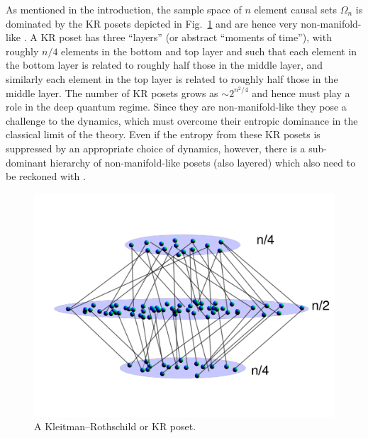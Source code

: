 As mentioned in the  introduction, the sample space of $n$ element causal sets $\Omega_n$ is dominated by the KR posets
depicted in Fig.~\ref{kr.fig} and are hence very non-manifold-like    \citep{kr}. A KR poset has   three ``layers'' (or abstract ``moments of
time''),  with roughly $n/4$ elements in the bottom and top layer and such that each  element  in the bottom
layer is related to roughly half those in the  middle layer, and similarly each element  in the top layer is related to
roughly half those in the middle layer.  The number of  KR posets grows as $\sim 2^{{n^2}/{4}}$ and hence must play a role in the
deep quantum regime. Since they are non-manifold-like  they pose  a challenge to the dynamics, which must overcome
their entropic dominance in the classical  limit of the theory.  Even if the entropy from these KR  posets is
  suppressed by an appropriate choice of dynamics, however, there is a sub-dominant hierarchy of non-manifold-like posets (also layered)
  which also need to be 
  reckoned with  \citep{dharone,dhartwo,pst}. 
\begin{figure}[htb]
\centering
\includegraphics[width=\textwidth]{KR}
\caption{A Kleitman--Rothschild or KR poset.}
\label{kr.fig}
\end{figure} 



